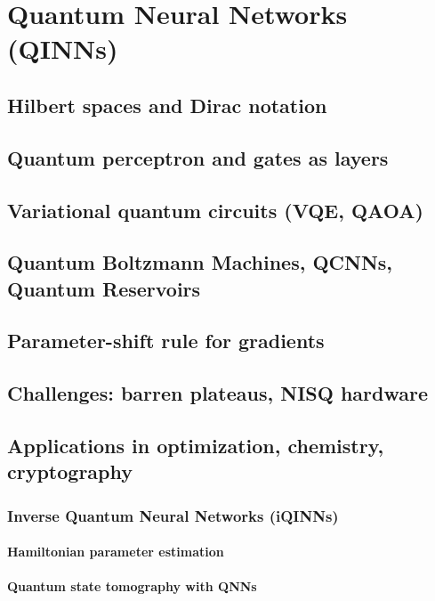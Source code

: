 ﻿\chapter{Quantum Neural Networks (QINNs)}
\section{Hilbert spaces and Dirac notation}

\section{Quantum perceptron and gates as layers}

\section{Variational quantum circuits (VQE, QAOA)}

\section{Quantum Boltzmann Machines, QCNNs, Quantum Reservoirs}

\section{Parameter-shift rule for gradients}

\section{Challenges: barren plateaus, NISQ hardware}

\section{Applications in optimization, chemistry, cryptography}
\subsection{Inverse Quantum Neural Networks (iQINNs)} %
\subsubsection{Hamiltonian parameter estimation}
\subsubsection{Quantum state tomography with QNNs}
